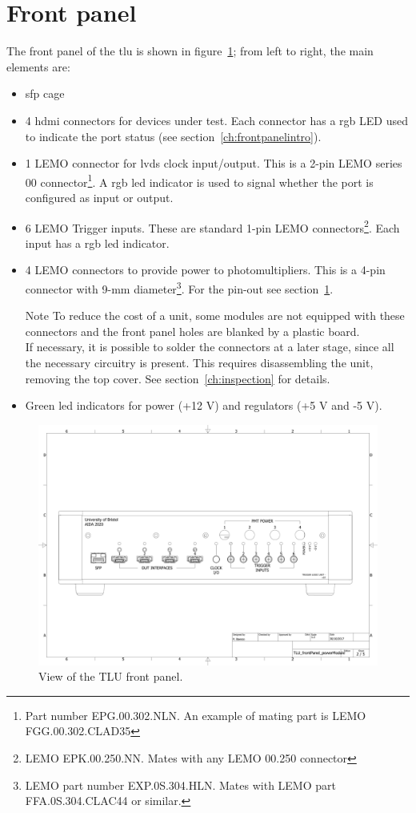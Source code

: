 \section{Front panel}\label{ch:frontpanel}
The front panel of the \gls{tlu} is shown in figure~\ref{fig:frontpanel}; from left to right, the main elements are:
\begin{itemize}
  \item \gls{sfp} cage
  \item 4 \gls{hdmi} connectors for devices under test. Each connector has a \gls{rgb} LED used to indicate the port status (see section~\ref{ch:frontpanelintro}).
  \item 1 LEMO connector for \gls{lvds} clock input/output. This is a 2-pin LEMO series 00 connector\footnote{Part number EPG.00.302.NLN. An example of mating part is LEMO FGG.00.302.CLAD35}. A \gls{rgb} \gls{led} indicator is used to signal whether the port is configured as input or output.
  \item 6 LEMO Trigger inputs. These are standard 1-pin LEMO connectors\footnote{LEMO EPK.00.250.NN. Mates with any LEMO 00.250 connector}. Each input has a \gls{rgb} \gls{led} indicator.
  \item 4 LEMO connectors to provide power to photomultipliers. This is a 4-pin connector with 9-mm diameter\footnote{LEMO part number EXP.0S.304.HLN. Mates with LEMO part FFA.0S.304.CLAC44 or similar.}. For the pin-out see section~\ref{ch:frontpanel}.
  \begin{alertinfo}{Note}
    To reduce the cost of a unit, some modules are not equipped with these connectors and the front panel holes are blanked by a plastic board.\\
    If necessary, it is possible to solder the connectors at a later stage, since all the necessary circuitry is present. This requires disassembling the unit, removing the top cover. See section~\ref{ch:inspection} for details.
  \end{alertinfo}
  \item Green \gls{led} indicators for power (+12 V) and regulators (+5 V and -5 V).
\end{itemize}
\begin{figure}
  \centering
  \includegraphics[width=.950\textwidth]{./Images/frontPanel.pdf}
  \caption{View of the TLU front panel.}
  \label{fig:frontpanel}
\end{figure}

